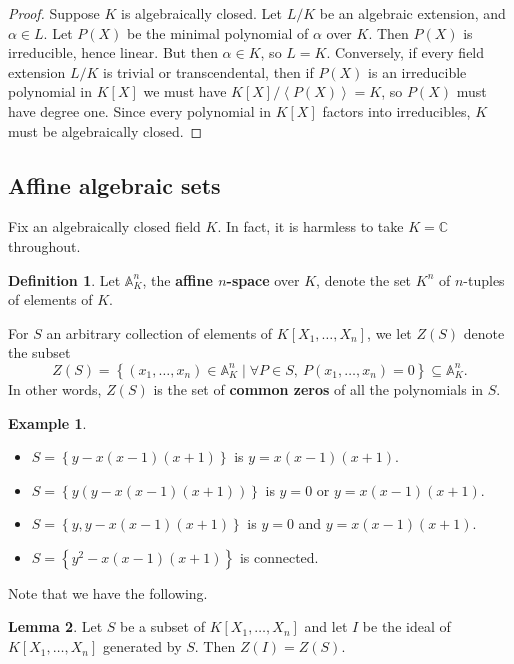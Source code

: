 \documentclass{article}
\newcommand{\C}{\mathbb{C}}
\newcommand{\A}{\mathbb{A}}
\newcommand{\rb}[1]{\left( #1 \right)}
\renewcommand{\sb}[1]{\left[ #1 \right]}
\newcommand{\cb}[1]{\left\{ #1 \right\}}
\newcommand{\ab}[1]{\left\langle #1 \right\rangle}
\theoremstyle{definition}\newtheorem{definition}{Definition}[subsection]
\theoremstyle{definition}\newtheorem{remark}[definition]{Remark}
\theoremstyle{definition}\newtheorem*{example}{Example}
\theoremstyle{definition}\newtheorem*{note}{Note}
\newtheorem{lemma}[definition]{Lemma}
\begin{document}
\begin{proof}
Suppose $ K $ is algebraically closed. Let $ L / K $ be an algebraic extension, and $ \alpha \in L $. Let $ P\rb{X} $ be the minimal polynomial of $ \alpha $ over $ K $. Then $ P\rb{X} $ is irreducible, hence linear. But then $ \alpha \in K $, so $ L = K $. Conversely, if every field extension $ L / K $ is trivial or transcendental, then if $ P\rb{X} $ is an irreducible polynomial in $ K\sb{X} $ we must have $ K\sb{X} / \ab{P\rb{X}} = K $, so $ P\rb{X} $ must have degree one. Since every polynomial in $ K\sb{X} $ factors into irreducibles, $ K $ must be algebraically closed.
\end{proof}

\subsection{Affine algebraic sets}

Fix an algebraically closed field $ K $. In fact, it is harmless to take $ K = \C $ throughout.

\begin{definition}
Let $ \A_K^n $, the \textbf{affine $ n $-space} over $ K $, denote the set $ K^n $ of $ n $-tuples of elements of $ K $.
\end{definition}

For $ S $ an arbitrary collection of elements of $ K\sb{X_1, \dots, X_n} $, we let $ Z\rb{S} $ denote the subset
$$ Z\rb{S} = \cb{\rb{x_1, \dots, x_n} \in \A_K^n \mid \forall P \in S, \ P\rb{x_1, \dots, x_n} = 0} \subseteq \A_K^n. $$
In other words, $ Z\rb{S} $ is the set of \textbf{common zeros} of all the polynomials in $ S $.

\begin{example}
\hfill
\begin{itemize}
\item $ S = \cb{y - x\rb{x - 1}\rb{x + 1}} $ is $ y = x\rb{x - 1}\rb{x + 1} $.
\item $ S = \cb{y\rb{y - x\rb{x - 1}\rb{x + 1}}} $ is $ y = 0 $ or $ y = x\rb{x - 1}\rb{x + 1} $.
\item $ S = \cb{y, y - x\rb{x - 1}\rb{x + 1}} $ is $ y = 0 $ and $ y = x\rb{x - 1}\rb{x + 1} $.
\item $ S = \cb{y^2 - x\rb{x - 1}\rb{x + 1}} $ is connected.
\end{itemize}
\end{example}

Note that we have the following.

\begin{lemma}
Let $ S $ be a subset of $ K\sb{X_1, \dots, X_n} $ and let $ I $ be the ideal of $ K\sb{X_1, \dots, X_n} $ generated by $ S $. Then $ Z\rb{I} = Z\rb{S} $.
\end{lemma}
\end{document}
